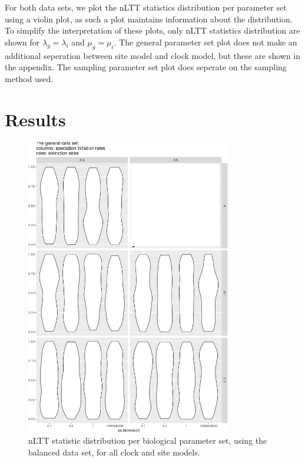 \documentclass{article}
\begin{document}
For both data sets, we plot the nLTT statistics distribution per
parameter set using a violin plot, as such a plot 
maintains information about the distribution. To simplify the interpretation
of these plots, only nLTT statistics distribution are shown 
for $\lambda_g = \lambda_i$ and $\mu_g = \mu_i$. The general parameter set plot
does not make an additional seperation between site model and clock model, but these
are shown in the appendix. The sampling parameter set plot does seperate 
on the sampling method used.

\section{Results}

\begin{figure}[!htbp]
  \includegraphics[width=0.8\textwidth]{fig_general.png}
  \caption{
    nLTT statistic distribution per biological parameter set, using the
    balanced data set, for all clock and site models.
  }
\end{figure}
\end{document}
